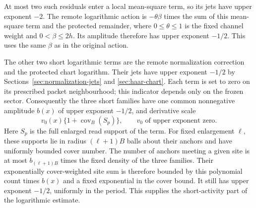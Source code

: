 At most two such residuals enter a local mean-square term, so its
jets have upper exponent $-2$. The remote logarithmic action is
$-\theta\beta$ times the sum of this mean-square term and the
protected remainder, where $0\le\theta\le1$ is the fixed channel
weight and $0<\beta\le2h$. Its amplitude therefore has upper
exponent $-1/2$. This uses the same $\beta$ as in the original
action.

The other two short logarithmic terms are the remote normalization
correction and the protected chart logarithm. Their jets have upper
exponent $-1/2$ by Sections~\ref{sec:normalization-jets} and
\ref{sec:haar-chart}. Each term is set to zero on its prescribed
packet neighbourhood; this indicator depends only on the frozen
sector. Consequently the three short families have one common
nonnegative amplitude $b(x)$ of upper exponent $-1/2$, and
derivative scale
\begin{equation}\label{eq:remote-short-price}
 v_0(x)\{1+\operatorname{cov}_B(S_p)\},
 \qquad v_0\text{ of upper exponent zero}.
\end{equation}
Here $S_p$ is the full enlarged read support of the term.
For fixed enlargement $\ell$, these supports lie in radius
$(\ell+1)B$ balls about their anchors and have uniformly bounded
cover number. The number of anchors meeting a given site is at
most $b_{(\ell+1)B}$ times the fixed density of the three families.
Their exponentially cover-weighted site sum is therefore bounded
by this polynomial count times $b(x)$ and a fixed exponential
in the cover bound. It still has upper exponent $-1/2$, uniformly
in the period. This supplies the short-activity part of the
logarithmic estimate.
